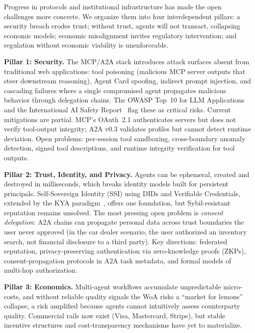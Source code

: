 \documentclass{IEEEcsmag}
\begin{document}
Progress in protocols and institutional infrastructure has made the open challenges more concrete. We organize them into four interdependent pillars: a security breach erodes trust; without trust, agents will not transact, collapsing economic models; economic misalignment invites regulatory intervention; and regulation without economic viability is unenforceable.

\textbf{Pillar 1: Security.}  The MCP/A2A stack introduces attack surfaces absent from traditional web applications: tool poisoning (malicious MCP server outputs that steer downstream reasoning), Agent Card spoofing, indirect prompt injection, and cascading failures where a single compromised agent propagates malicious behavior through delegation chains.  The OWASP Top~10 for LLM Applications~\cite{OWASP_LLM_2025} and the International AI Safety Report~\cite{AISAFETY_2025} flag these as critical risks.  Current mitigations are partial. MCP's OAuth~2.1 authenticates servers but does not verify tool-output integrity; A2A v0.3 validates profiles but cannot detect runtime deviation.  Open problems: per-session tool sandboxing, cross-boundary anomaly detection, signed tool descriptions, and runtime integrity verification for tool outputs.

\textbf{Pillar 2: Trust, Identity, and Privacy.}  Agents can be ephemeral, created and destroyed in milliseconds, which breaks identity models built for persistent principals.  Self-Sovereign Identity (SSI) using DIDs and Verifiable Credentials, extended by the KYA paradigm~\cite{KYA_Paradigm_2025}, offers one foundation, but Sybil-resistant reputation remains unsolved.  The most pressing open problem is \emph{consent delegation}: A2A chains can propagate personal data across trust boundaries the user never approved (in the car dealer scenario, the user authorized an inventory search, not financial disclosure to a third party).  Key directions: federated reputation, privacy-preserving authentication via zero-knowledge proofs (ZKPs), consent-propagation protocols in A2A task metadata, and formal models of multi-hop authorization.

\textbf{Pillar 3: Economics.}  Multi-agent workflows accumulate unpredictable micro-costs, and without reliable quality signals the WoA risks a ``market for lemons'' collapse, a risk amplified because agents cannot intuitively assess counterparty quality.  Commercial rails now exist (Visa, Mastercard, Stripe), but stable incentive structures and cost-transparency mechanisms have yet to materialize.
\end{document}

